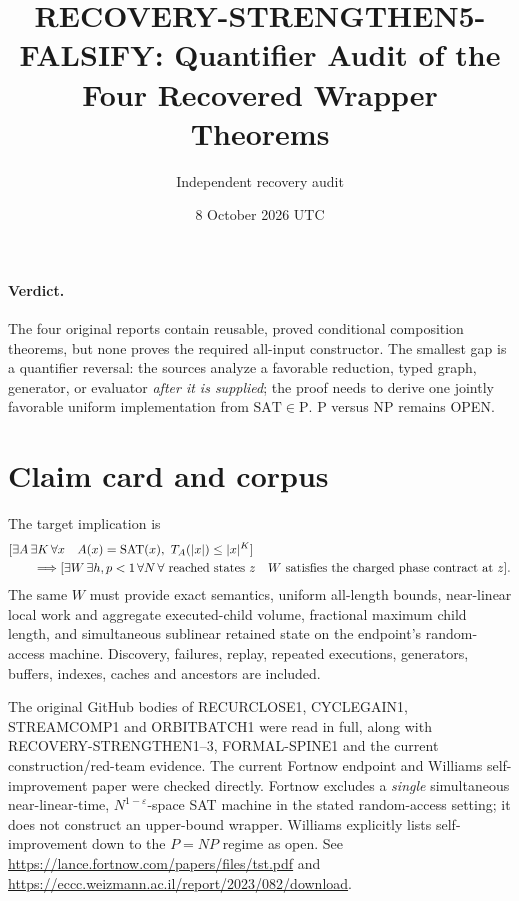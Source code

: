\documentclass[11pt]{article}
\title{RECOVERY-STRENGTHEN5-FALSIFY: Quantifier Audit of the Four Recovered Wrapper Theorems}
\author{Independent recovery audit}
\date{8 October 2026 UTC}
\begin{document}
\sloppy\maketitle

\paragraph{Verdict.}
The four original reports contain reusable, proved conditional composition
theorems, but none proves the required all-input constructor.  The smallest
gap is a quantifier reversal: the sources analyze a favorable reduction,
typed graph, generator, or evaluator \emph{after it is supplied}; the proof
needs to derive one jointly favorable uniform implementation from
$\mathrm{SAT}\in\mathrm P$.  P versus NP remains OPEN.

\section*{Claim card and corpus}
The target implication is
\begin{align*}
&[\exists A\,\exists K\,\forall x\quad A(x)=\mathrm{SAT}(x),\ 
 T_A(|x|)\le |x|^K]\\
&\qquad\Longrightarrow
 [\exists W\,\exists h,p<1\,\forall N\,\forall\hbox{ reached states }z
 \quad W\hbox{ satisfies the charged phase contract at }z].
\end{align*}
The same $W$ must provide exact semantics, uniform all-length bounds,
near-linear local work and aggregate executed-child volume, fractional
maximum child length, and simultaneous sublinear retained state on the
endpoint's random-access machine.  Discovery, failures, replay, repeated
executions, generators, buffers, indexes, caches and ancestors are included.

The original GitHub bodies of RECURCLOSE1, CYCLEGAIN1, STREAMCOMP1 and
ORBITBATCH1 were read in full, along with RECOVERY-STRENGTHEN1--3,
FORMAL-SPINE1 and the current construction/red-team evidence.  The current
Fortnow endpoint and Williams self-improvement paper were checked directly.
Fortnow excludes a \emph{single} simultaneous near-linear-time,
$N^{1-\varepsilon}$-space SAT machine in the stated random-access setting;
it does not construct an upper-bound wrapper.  Williams explicitly lists
self-improvement down to the $P=NP$ regime as open.  See
\url{https://lance.fortnow.com/papers/files/tst.pdf} and
\url{https://eccc.weizmann.ac.il/report/2023/082/download}.
\end{document}
